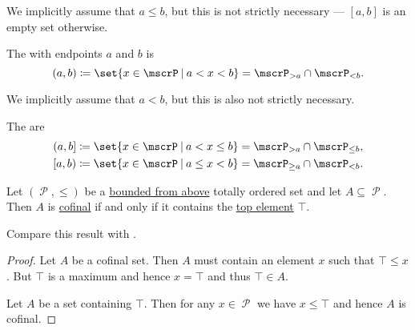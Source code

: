 \begin{definition}
\begin{thmenum}
    We implicitly assume that \( a \leq b \), but this is not strictly necessary --- \( [a, b] \) is an empty set otherwise.

     The  with endpoints \( a \) and \( b \) is
    \begin{equation*}
      (a, b) \coloneqq \set{ x \in \mscrP \given a < x < b } = \mscrP_{> a} \cap \mscrP_{< b}.
    \end{equation*}

    We implicitly assume that \( a < b \), but this is also not strictly necessary.

     The  are
    \begin{equation*}
      \begin{aligned}
        (a, b] \coloneqq \set{ x \in \mscrP \given a < x \leq b } = \mscrP_{> a} \cap \mscrP_{\leq b},
        \\
        [a, b) \coloneqq \set{ x \in \mscrP \given a \leq x < b } = \mscrP_{\geq a} \cap \mscrP_{< b}.
      \end{aligned}
    \end{equation*}
  \end{thmenum}
\end{definition}

\begin{proposition}\label{thm:partially_ordered_cofinal_equivalences}
  Let \( (\mscrP, \leq) \) be a \hyperref[def:partially_ordered_set_extremal_points/upper_and_lower_bounds]{bounded from above} totally ordered set and let \( A \subseteq \mscrP \). Then \( A \) is \hyperref[def:cofinal_set]{cofinal} if and only if it contains the \hyperref[def:partially_ordered_set_extremal_points/top_and_bottom]{top element} \( \top \).

  Compare this result with .
\end{proposition}
\begin{proof}
  \SufficiencySubProof Let \( A \) be a cofinal set. Then \( A \) must contain an element \( x \) such that \( \top \leq x \). But \( \top \) is a maximum and hence \( x = \top \) and thus \( \top \in A \).

  \NecessitySubProof Let \( A \) be a set containing \( \top \). Then for any \( x \in \mscrP \) we have \( x \leq \top \) and hence \( A \) is cofinal.
\end{proof}

